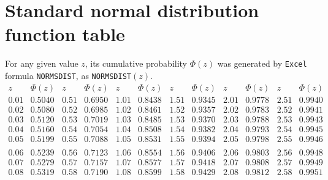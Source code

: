 \section{Standard normal distribution function table}\label{S:NormalDFTable}

{\scriptsize{
For any given value $z$, its cumulative probability $\Phi(z)$ was generated by {\tt Excel} formula {\tt NORMSDIST}, as {\tt NORMSDIST}$(z)$.
$$
 \begin{array}{|c|c|c|c|c|c|c|c|c|c|c|c|}\hline
z       &       \Phi(z) &       z       &       \Phi(z) &       z       &       \Phi(z) &       z       &       \Phi(z) &       z       &       \Phi(z) &       z       &       \Phi(z) \\ \hline
0.01    &       0.5040  &       0.51    &       0.6950  &       1.01    &       0.8438  &       1.51    &       0.9345  &       2.01    &       0.9778  &       2.51    &       0.9940  \\
0.02    &       0.5080  &       0.52    &       0.6985  &       1.02    &       0.8461  &       1.52    &       0.9357  &       2.02    &       0.9783  &       2.52    &       0.9941  \\
0.03    &       0.5120  &       0.53    &       0.7019  &       1.03    &       0.8485  &       1.53    &       0.9370  &       2.03    &       0.9788  &       2.53    &       0.9943  \\
0.04    &       0.5160  &       0.54    &       0.7054  &       1.04    &       0.8508  &       1.54    &       0.9382  &       2.04    &       0.9793  &       2.54    &       0.9945  \\
0.05    &       0.5199  &       0.55    &       0.7088  &       1.05    &       0.8531  &       1.55    &       0.9394  &       2.05    &       0.9798  &       2.55    &       0.9946  \\
&&&&&&&&&&&\\
0.06    &       0.5239  &       0.56    &       0.7123  &       1.06    &       0.8554  &       1.56    &       0.9406  &       2.06    &       0.9803  &       2.56    &       0.9948  \\
0.07    &       0.5279  &       0.57    &       0.7157  &       1.07    &       0.8577  &       1.57    &       0.9418  &       2.07    &       0.9808  &       2.57    &       0.9949  \\
0.08    &       0.5319  &       0.58    &       0.7190  &       1.08    &       0.8599  &       1.58    &       0.9429  &       2.08    &       0.9812  &       2.58    &       0.9951  \\

\end{array}$$}}
